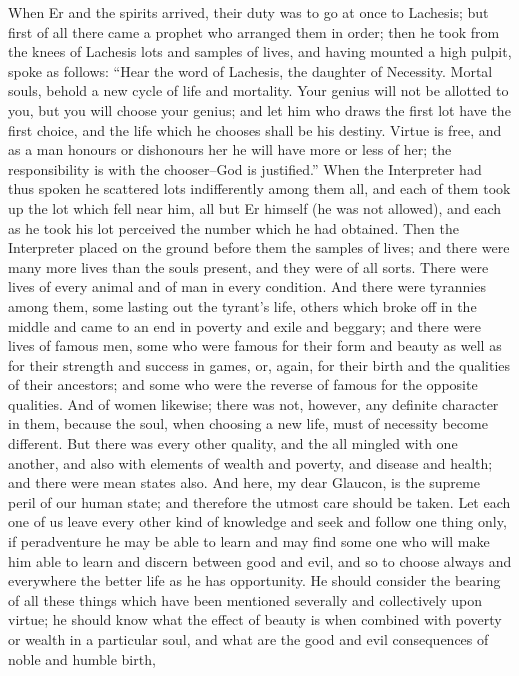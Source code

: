 When Er and the spirits arrived, their duty was to go at once to
Lachesis; but first of all there came a prophet who arranged them in
order; then he took from the knees of Lachesis lots and samples of
lives, and having mounted a high pulpit, spoke as follows: ``Hear the
word of Lachesis, the daughter of Necessity. Mortal souls, behold a new
cycle of life and mortality. Your genius will not be allotted to you,
but you will choose your genius; and let him who draws the first lot
have the first choice, and the life which he chooses shall be his
destiny. Virtue is free, and as a man honours or dishonours her he will
have more or less of her; the responsibility is with the chooser--God
is justified.'' When the Interpreter had thus spoken he scattered lots
indifferently among them all, and each of them took up the lot which
fell near him, all but Er himself (he was not allowed), and each as
he took his lot perceived the number which he had obtained. Then the
Interpreter placed on the ground before them the samples of lives; and
there were many more lives than the souls present, and they were of all
sorts. There were lives of every animal and of man in every condition.
And there were tyrannies among them, some lasting out the tyrant's life,
others which broke off in the middle and came to an end in poverty and
exile and beggary; and there were lives of famous men, some who were
famous for their form and beauty as well as for their strength and
success in games, or, again, for their birth and the qualities of their
ancestors; and some who were the reverse of famous for the opposite
qualities. And of women likewise; there was not, however, any definite
character in them, because the soul, when choosing a new life, must of
necessity become different. But there was every other quality, and
the all mingled with one another, and also with elements of wealth and
poverty, and disease and health; and there were mean states also. And
here, my dear Glaucon, is the supreme peril of our human state; and
therefore the utmost care should be taken. Let each one of us leave
every other kind of knowledge and seek and follow one thing only, if
peradventure he may be able to learn and may find some one who will make
him able to learn and discern between good and evil, and so to choose
always and everywhere the better life as he has opportunity. He should
consider the bearing of all these things which have been mentioned
severally and collectively upon virtue; he should know what the effect
of beauty is when combined with poverty or wealth in a particular soul,
and what are the good and evil consequences of noble and humble birth,
